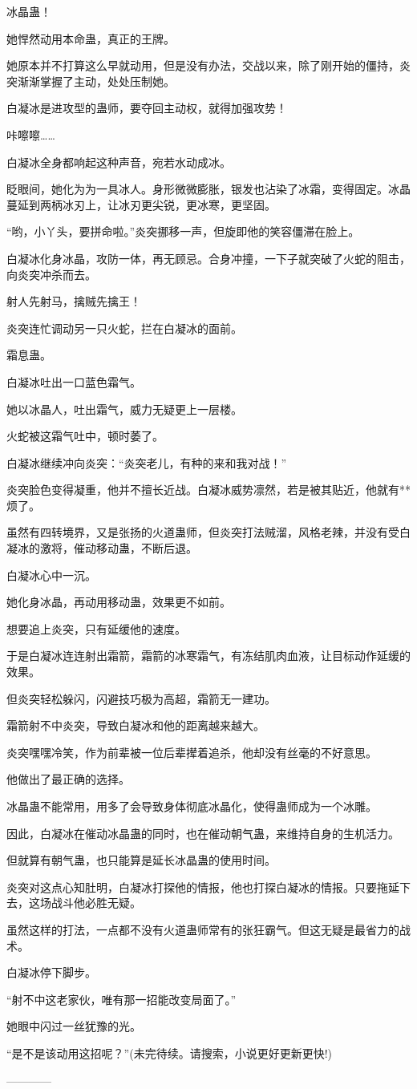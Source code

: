 \begin{this_body}
冰晶蛊！

她悍然动用本命蛊，真正的王牌。

她原本并不打算这么早就动用，但是没有办法，交战以来，除了刚开始的僵持，炎突渐渐掌握了主动，处处压制她。

白凝冰是进攻型的蛊师，要夺回主动权，就得加强攻势！

咔嚓嚓……

白凝冰全身都响起这种声音，宛若水动成冰。

眨眼间，她化为为一具冰人。身形微微膨胀，银发也沾染了冰霜，变得固定。冰晶蔓延到两柄冰刃上，让冰刃更尖锐，更冰寒，更坚固。

“哟，小丫头，要拼命啦。”炎突挪移一声，但旋即他的笑容僵滞在脸上。

白凝冰化身冰晶，攻防一体，再无顾忌。合身冲撞，一下子就突破了火蛇的阻击，向炎突冲杀而去。

射人先射马，擒贼先擒王！

炎突连忙调动另一只火蛇，拦在白凝冰的面前。

霜息蛊。

白凝冰吐出一口蓝色霜气。

她以冰晶人，吐出霜气，威力无疑更上一层楼。

火蛇被这霜气吐中，顿时萎了。

白凝冰继续冲向炎突：“炎突老儿，有种的来和我对战！”

炎突脸色变得凝重，他并不擅长近战。白凝冰威势凛然，若是被其贴近，他就有**烦了。

虽然有四转境界，又是张扬的火道蛊师，但炎突打法贼溜，风格老辣，并没有受白凝冰的激将，催动移动蛊，不断后退。

白凝冰心中一沉。

她化身冰晶，再动用移动蛊，效果更不如前。

想要追上炎突，只有延缓他的速度。

于是白凝冰连连射出霜箭，霜箭的冰寒霜气，有冻结肌肉血液，让目标动作延缓的效果。

但炎突轻松躲闪，闪避技巧极为高超，霜箭无一建功。

霜箭射不中炎突，导致白凝冰和他的距离越来越大。

炎突嘿嘿冷笑，作为前辈被一位后辈撵着追杀，他却没有丝毫的不好意思。

他做出了最正确的选择。

冰晶蛊不能常用，用多了会导致身体彻底冰晶化，使得蛊师成为一个冰雕。

因此，白凝冰在催动冰晶蛊的同时，也在催动朝气蛊，来维持自身的生机活力。

但就算有朝气蛊，也只能算是延长冰晶蛊的使用时间。

炎突对这点心知肚明，白凝冰打探他的情报，他也打探白凝冰的情报。只要拖延下去，这场战斗他必胜无疑。

虽然这样的打法，一点都不没有火道蛊师常有的张狂霸气。但这无疑是最省力的战术。

白凝冰停下脚步。

“射不中这老家伙，唯有那一招能改变局面了。”

她眼中闪过一丝犹豫的光。

“是不是该动用这招呢？”(未完待续。请搜索，小说更好更新更快!)

------------

\end{this_body}

